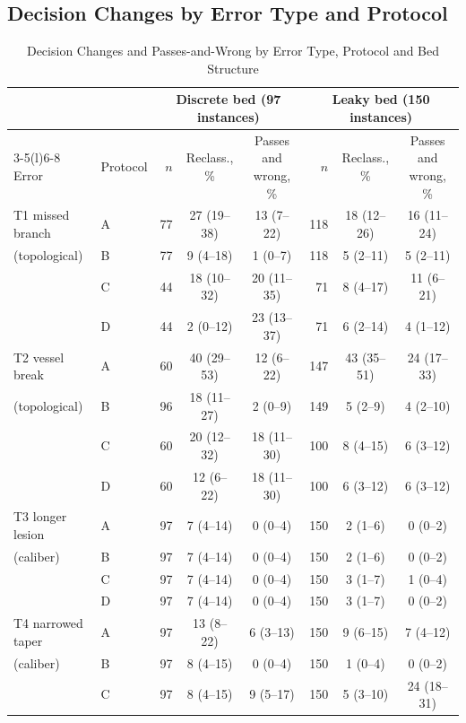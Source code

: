 \documentclass[journal,twoside,web]{ieeecolor}
\begin{document}
\subsection{Decision Changes by Error Type and Protocol}
\begin{table}[!t]
\caption{Decision Changes and Passes-and-Wrong by Error Type, Protocol and Bed Structure}
\label{tab:results}
\centering\footnotesize
\begin{tabular}{@{}llrccrcc@{}}
\toprule
 & & \multicolumn{3}{c}{Discrete bed (97 instances)} & \multicolumn{3}{c}{Leaky bed (150 instances)}\\
\cmidrule(lr){3-5}\cmidrule(l){6-8}
Error & Protocol & $n$ & Reclass., \% & Passes and wrong, \% & $n$ & Reclass., \% & Passes and wrong, \%\\
\midrule
T1 missed branch & A & 77 & 27 (19--38) & 13 (7--22) & 118 & 18 (12--26) & 16 (11--24) \\
\quad (topological) & B & 77 & 9 (4--18) & 1 (0--7) & 118 & 5 (2--11) & 5 (2--11) \\
 & C & 44 & 18 (10--32) & 20 (11--35) & 71 & 8 (4--17) & 11 (6--21) \\
 & D & 44 & 2 (0--12) & 23 (13--37) & 71 & 6 (2--14) & 4 (1--12) \\
\addlinespace[2pt]
T2 vessel break & A & 60 & 40 (29--53) & 12 (6--22) & 147 & 43 (35--51) & 24 (17--33) \\
\quad (topological) & B & 96 & 18 (11--27) & 2 (0--9) & 149 & 5 (2--9) & 4 (2--10) \\
 & C & 60 & 20 (12--32) & 18 (11--30) & 100 & 8 (4--15) & 6 (3--12) \\
 & D & 60 & 12 (6--22) & 18 (11--30) & 100 & 6 (3--12) & 6 (3--12) \\
\addlinespace[2pt]
T3 longer lesion & A & 97 & 7 (4--14) & 0 (0--4) & 150 & 2 (1--6) & 0 (0--2) \\
\quad (caliber) & B & 97 & 7 (4--14) & 0 (0--4) & 150 & 2 (1--6) & 0 (0--2) \\
 & C & 97 & 7 (4--14) & 0 (0--4) & 150 & 3 (1--7) & 1 (0--4) \\
 & D & 97 & 7 (4--14) & 0 (0--4) & 150 & 3 (1--7) & 0 (0--2) \\
\addlinespace[2pt]
T4 narrowed taper & A & 97 & 13 (8--22) & 6 (3--13) & 150 & 9 (6--15) & 7 (4--12) \\
\quad (caliber) & B & 97 & 8 (4--15) & 0 (0--4) & 150 & 1 (0--4) & 0 (0--2) \\
 & C & 97 & 8 (4--15) & 9 (5--17) & 150 & 5 (3--10) & 24 (18--31) \\

\end{tabular}
\end{table}
\end{document}
